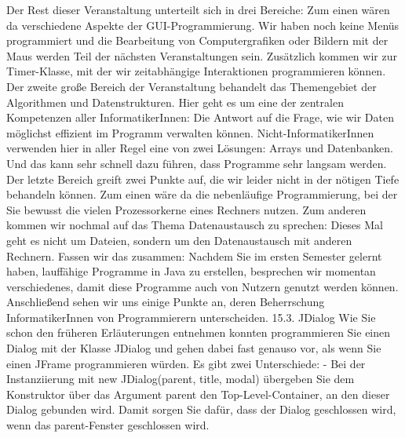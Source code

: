 Der Rest dieser Veranstaltung unterteilt sich in drei Bereiche: Zum einen wären da verschiedene Aspekte der GUI-Programmierung. Wir haben noch keine Menüs programmiert und die Bearbeitung von Computergrafiken oder Bildern mit der Maus werden Teil der nächsten Veranstaltungen sein. Zusätzlich kommen wir zur Timer-Klasse, mit der wir zeitabhängige Interaktionen programmieren können.
Der zweite große Bereich der Veranstaltung behandelt das Themengebiet der Algorithmen und Datenstrukturen. Hier geht es um eine der zentralen Kompetenzen aller InformatikerInnen: Die Antwort auf die Frage, wie wir Daten möglichst effizient im Programm verwalten können. Nicht-InformatikerInnen verwenden hier in aller Regel eine von zwei Lösungen: Arrays und Datenbanken. Und das kann sehr schnell dazu führen, dass Programme sehr langsam werden.
Der letzte Bereich greift zwei Punkte auf, die wir leider nicht in der nötigen Tiefe behandeln können. Zum einen wäre da die nebenläufige Programmierung, bei der Sie bewusst die vielen Prozessorkerne eines Rechners nutzen. Zum anderen kommen wir nochmal auf das Thema Datenaustausch zu sprechen: Dieses Mal geht es nicht um Dateien, sondern um den Datenaustausch mit anderen Rechnern.
Fassen wir das zusammen: Nachdem Sie im ersten Semester gelernt haben, lauffähige Programme in Java zu erstellen, besprechen wir momentan verschiedenes, damit diese Programme auch von Nutzern genutzt werden können. Anschließend sehen wir uns einige Punkte an, deren Beherrschung InformatikerInnen von Programmierern unterscheiden.
15.3.	JDialog
Wie Sie schon den früheren Erläuterungen entnehmen konnten programmieren Sie einen Dialog mit der Klasse JDialog und gehen dabei fast genauso vor, als wenn Sie einen JFrame programmieren würden.
Es gibt zwei Unterschiede: 
-	Bei der Instanziierung mit new JDialog(parent, title, modal) übergeben Sie dem Konstruktor über das Argument parent den Top-Level-Container, an den dieser Dialog gebunden wird. Damit sorgen Sie dafür, dass der Dialog geschlossen wird, wenn das parent-Fenster geschlossen wird.

